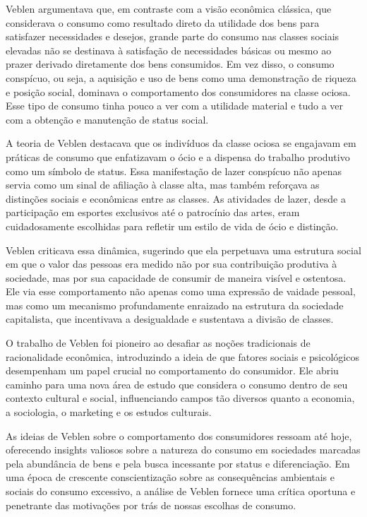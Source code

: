 \documentclass[a4paper,12pt]{article}[abntex2]
\begin{document}
Veblen argumentava que, em contraste com a visão econômica clássica, que considerava o consumo como resultado direto da utilidade dos bens para satisfazer necessidades e desejos, grande parte do consumo nas classes sociais elevadas não se destinava à satisfação de necessidades básicas ou mesmo ao prazer derivado diretamente dos bens consumidos. Em vez disso, o consumo conspícuo, ou seja, a aquisição e uso de bens como uma demonstração de riqueza e posição social, dominava o comportamento dos consumidores na classe ociosa. Esse tipo de consumo tinha pouco a ver com a utilidade material e tudo a ver com a obtenção e manutenção de status social.

A teoria de Veblen destacava que os indivíduos da classe ociosa se engajavam em práticas de consumo que enfatizavam o ócio e a dispensa do trabalho produtivo como um símbolo de status. Essa manifestação de lazer conspícuo não apenas servia como um sinal de afiliação à classe alta, mas também reforçava as distinções sociais e econômicas entre as classes. As atividades de lazer, desde a participação em esportes exclusivos até o patrocínio das artes, eram cuidadosamente escolhidas para refletir um estilo de vida de ócio e distinção.

Veblen criticava essa dinâmica, sugerindo que ela perpetuava uma estrutura social em que o valor das pessoas era medido não por sua contribuição produtiva à sociedade, mas por sua capacidade de consumir de maneira visível e ostentosa. Ele via esse comportamento não apenas como uma expressão de vaidade pessoal, mas como um mecanismo profundamente enraizado na estrutura da sociedade capitalista, que incentivava a desigualdade e sustentava a divisão de classes.

O trabalho de Veblen foi pioneiro ao desafiar as noções tradicionais de racionalidade econômica, introduzindo a ideia de que fatores sociais e psicológicos desempenham um papel crucial no comportamento do consumidor. Ele abriu caminho para uma nova área de estudo que considera o consumo dentro de seu contexto cultural e social, influenciando campos tão diversos quanto a economia, a sociologia, o marketing e os estudos culturais.

As ideias de Veblen sobre o comportamento dos consumidores ressoam até hoje, oferecendo insights valiosos sobre a natureza do consumo em sociedades marcadas pela abundância de bens e pela busca incessante por status e diferenciação. Em uma época de crescente conscientização sobre as consequências ambientais e sociais do consumo excessivo, a análise de Veblen fornece uma crítica oportuna e penetrante das motivações por trás de nossas escolhas de consumo.
\end{document}
